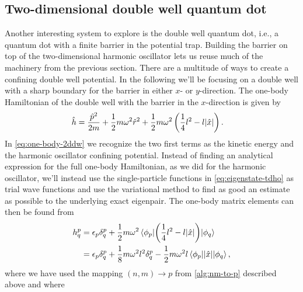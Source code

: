     \subsection{Two-dimensional double well quantum dot}
        \label{subsec:tddw}
        Another interesting system to explore is the double well quantum dot,
        i.e., a quantum dot with a finite barrier in the potential trap.
        Building the barrier on top of the two-dimensional harmonic oscillator
        lets us reuse much of the machinery from the previous section.
        There are a multitude of ways to create a confining double well
        potential.
        In the following we'll be focusing on a double well with a sharp
        boundary for the barrier in either $x$- or $y$-direction.
        The one-body Hamiltonian of the double well with the barrier in the
        $x$-direction is given by
        \begin{align}
            \onehamil
            &=
            \frac{\momentum^2}{2m}
            + \half m \omega^2 \position[r]^2
            + \half m \omega^2 \para{
                \frac{1}{4} l^2 - l\abs{\position}
            }.
            \label{eq:one-body-2ddw}
        \end{align}
        In \autoref{eq:one-body-2ddw} we recognize the two first terms as the
        kinetic energy and the harmonic oscillator confining potential.
        Instead of finding an analytical expression for the full one-body
        Hamiltonian, as we did for the harmonic oscillator, we'll instead use
        the single-particle functions in \autoref{eq:eigenstate-tdho} as trial
        wave functions and use the variational method to find as good an
        estimate as possible to the underlying exact eigenpair.
        The one-body matrix elements can then be found from
        \begin{align}
            h^{p}_{q}
            &= \epsilon_{p}\delta^{p}_{q}
            + \frac{1}{2} m \omega^2\mel*{\phi_p}{
                \left( 
                    \frac{1}{4} l^2 - l \abs{\hat{x}}
                 \right)
            }{\phi_q}
            \\
            &= \epsilon_{p}\delta^{p}_{q}
            + \frac{1}{8} m \omega^2 l^2 \delta^{p}_{q}
            - \frac{1}{2} m \omega^2 l \mel*{\phi_p}{\abs{\hat{x}}}{\phi_q},
        \end{align}
        where we have used the mapping $(n, m) \to p$ from
        \autoref{alg:nm-to-p} described above and where
